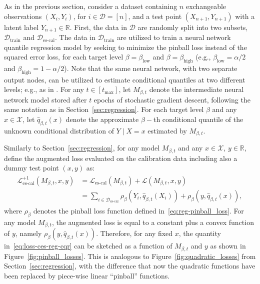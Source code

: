 As in the previous section, consider a dataset containing $n$ exchangeable observations $(X_i,Y_i)$, for $i \in \mathcal{D} = [n]$, and a test point $(X_{n+1}, Y_{n+1})$ with a latent label $Y_{n+1} \in \mathbb{R}$. 
First, the data in $\mathcal{D}$ are randomly split into two subsets, $\mathcal{D}_{\text{train}}$ and $\mathcal{D}_{\text{es-cal}}$. The data in $\mathcal{D}_{\text{train}}$ are utilized to train a neural network quantile regression model \cite{taylor2000quantile} by seeking to minimize the pinball loss instead of the squared error loss, for each target level $\beta=\beta_{\text{low}}$ and $\beta=\beta_{\text{high}}$ (e.g., $\beta_{\text{low}} = \alpha/2$ and $\beta_{\text{high}}=1-\alpha/2$). Note that the same neural network, with two separate output nodes, can be utilized to estimate conditional quantiles at two different levels; e.g., as in \citet{romano2019conformalized}.
For any $t \in [t_{\max}]$, let $M_{\beta, t}$ denote the intermediate neural network model stored after $t$ epochs of stochastic gradient descent, following the same notation as in Section~\ref{sec:regression}.
For each target level $\beta$ and any $x \in \mathcal{X}$, let $\hat{q}_{\beta, t}(x)$ denote the approximate $\beta-$th conditional quantile of the unknown conditional distribution of $Y \mid X=x$ estimated by $M_{\beta, t}$.


Similarly to Section~\ref{sec:regression}, for any model $M_{\beta, t}$ and any $x \in \mathcal{X}$, $y \in \mathbb{R}$, define the augmented loss evaluated on the calibration data including also a dummy test point $(x,y)$ as:
\begin{align}\label{eq:loss-ces-reg-cqr}
  \begin{split}
    \mathcal{L}_{\text{es-cal}}^{+1}(M_{\beta, t},x,y)
    & = \mathcal{L}_{\text{es-cal}}(M_{\beta, t}) + \mathcal{L}(M_{\beta, t}, x, y) \\
    & = \sum_{i \in \mathcal{D}_{\text{es-cal}}} \rho_\beta(Y_i, \hat{q}_{\beta, t}(X_i)) + \rho_\beta(y, \hat{q}_{\beta, t}(x)),
  \end{split}
\end{align}
where $\rho_\beta$ denotes the pinball loss function defined in~\eqref{eq:reg-pinball_loss}.
For any model $M_{\beta, t}$, the augmented loss is equal to a constant plus a convex function of $y$, namely $\rho_\beta(y, \hat{q}_{\beta, t}(x))$.
Therefore, for any fixed $x$, the quantity in~\eqref{eq:loss-ces-reg-cqr} can be sketched as a function of $M_{\beta, t}$ and $y$ as shown in Figure~\ref{fig:pinball_losses}. This is analogous to Figure~\ref{fig:quadratic_losses} from Section~\ref{sec:regression}, with the difference that now the quadratic functions have been replaced by piece-wise linear ``pinball'' functions.


